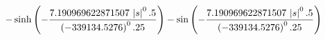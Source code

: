 $$-\sinh \left(-{{7.190969622871507\,\left| s\right| ^0.5}\over{
 \left(-339134.5276\right)^0.25}}\right)-\sin \left(-{{
 7.190969622871507\,\left| s\right| ^0.5}\over{\left(-339134.5276
 \right)^0.25}}\right)$$
